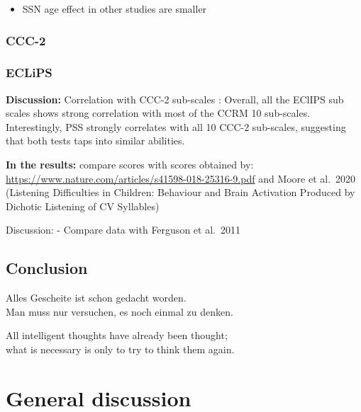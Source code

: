 \documentclass[a4paper, twoside]{templates/ociamthesis}
\providecommand{\tightlist}{%
  \setlength{\itemsep}{0pt}\setlength{\parskip}{0pt}}
\begin{document}
\begin{itemize}
\tightlist
\item
  SSN age effect in other studies are smaller
\end{itemize}

\hypertarget{ccc-2-1}{%
\subsection{CCC-2}\label{ccc-2-1}}

\hypertarget{eclips-1}{%
\subsection{ECLiPS}\label{eclips-1}}

\textbf{Discussion:} Correlation with CCC-2 sub-scales \autocite{Barry2014}: Overall, all the EClIPS sub scales shows strong correlation with most of the CCRM 10 sub-scales. Interestingly, PSS strongly correlates with all 10 CCC-2 sub-scales, suggesting that both tests taps into similar abilities.

\textbf{In the results:} compare scores with scores obtained by: \url{https://www.nature.com/articles/s41598-018-25316-9.pdf} and Moore et al.~2020 (Listening Difficulties in Children: Behaviour and Brain Activation Produced by Dichotic Listening of CV Syllables)

Discussion: - Compare data with Ferguson et al.~2011

\hypertarget{conclusion-2}{%
\section{Conclusion}\label{conclusion-2}}

\clearpage

\begin{savequote}
Alles Gescheite ist schon gedacht worden.\\
Man muss nur versuchen, es noch einmal zu denken.

All intelligent thoughts have already been thought;\\
what is necessary is only to try to think them again.
\end{savequote}



\hypertarget{general-discussion}{%
\chapter*{General discussion}\label{general-discussion}}
\end{document}
